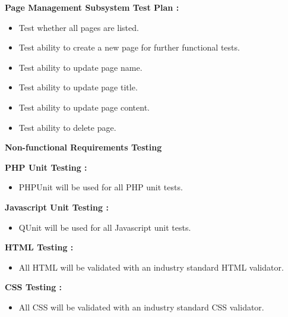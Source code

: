 \documentclass[11pt]{article}
\begin{document}
\vspace{2 mm}
\textbf{Page Management Subsystem Test Plan :}

\begin{itemize}
\item Test whether all pages are listed.
\item Test ability to create a new page for further functional tests.
\item Test ability to update page name.
\item Test ability to update page title.
\item Test ability to update page content.
\item Test ability to delete page.
\end{itemize}

\vspace{2 mm}
\textbf{\Large Non-functional Requirements Testing}
\vspace{5 mm}

\textbf{PHP Unit Testing :}

\begin{itemize}
\item PHPUnit will be used for all PHP unit tests.
\end{itemize}

\vspace{2 mm}
\textbf{Javascript Unit Testing :}

\begin{itemize}
\item QUnit will be used for all Javascript unit tests.
\end{itemize}

\vspace{2 mm}
\textbf{HTML Testing :}

\begin{itemize}
\item All HTML will be validated with an industry standard HTML validator.
\end{itemize}

\vspace{2 mm}
\textbf{CSS Testing :}

\begin{itemize}
\item All CSS will be validated with an industry standard CSS validator.
\end{itemize}
\end{document}
